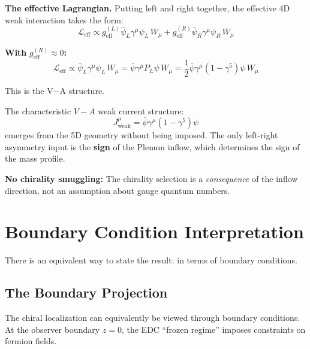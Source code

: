 \textbf{The effective Lagrangian.} Putting left and right together, the
effective 4D weak interaction takes the form:
\begin{equation}
    \mathcal{L}_{\text{eff}} \propto g_{\text{eff}}^{(L)} \bar\psi_L \gamma^\mu \psi_L \, W_\mu
    + g_{\text{eff}}^{(R)} \bar\psi_R \gamma^\mu \psi_R \, W_\mu
    \label{eq:ch9_L_eff}
\end{equation}

\textbf{With} $g_{\text{eff}}^{(R)} \approx 0$\textbf{:}
\begin{equation}
    \mathcal{L}_{\text{eff}} \propto \bar\psi_L \gamma^\mu \psi_L \, W_\mu
    = \bar\psi \gamma^\mu P_L \psi \, W_\mu
    = \frac{1}{2} \bar\psi \gamma^\mu (1 - \gamma^5) \psi \, W_\mu
    \label{eq:ch9_va_derived}
\end{equation}

This is the V$-$A structure.

\begin{tcolorbox}[edcCanonical, title=\textbf{V–A Structure Emergence [Dc]}]
The characteristic $V{-}A$ weak current structure:
\begin{equation}
    J^\mu_{\text{weak}} = \bar\psi \gamma^\mu (1 - \gamma^5) \psi
\end{equation}
emerges from the 5D geometry without being imposed. The only left-right
asymmetry input is the \textbf{sign} of the Plenum inflow, which determines
the sign of the mass profile.

\textbf{No chirality smuggling:} The chirality selection is a \emph{consequence}
of the inflow direction, not an assumption about gauge quantum numbers.
\end{tcolorbox}

\section{Boundary Condition Interpretation}
\label{sec:ch9_boundary}

There is an equivalent way to state the result: in terms of boundary conditions.

\subsection{The Boundary Projection}

The chiral localization can equivalently be viewed through boundary conditions.
At the observer boundary $z = 0$, the EDC ``frozen regime'' imposes constraints
on fermion fields.

